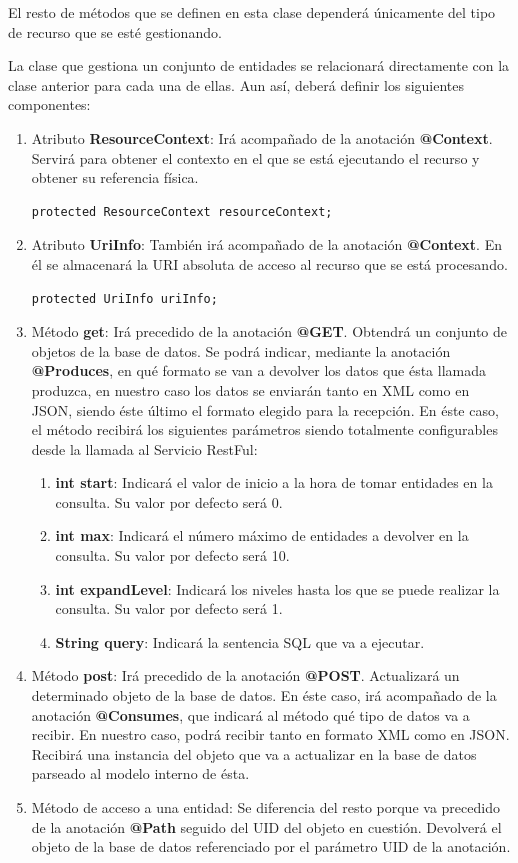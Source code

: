 El resto de métodos que se definen en esta clase dependerá únicamente del tipo de recurso que se esté gestionando.
\bigskip
\par
La clase que gestiona un conjunto de entidades se relacionará directamente con la clase anterior para cada una de ellas. Aun así, deberá definir los siguientes componentes:
\begin{enumerate}
\item Atributo \textbf{ResourceContext}: Irá acompañado de la anotación \textbf{@Context}. Servirá para obtener el contexto en el que se está ejecutando el recurso y obtener su referencia física.\begin{verbatim}protected ResourceContext resourceContext;\end{verbatim} 
\item Atributo \textbf{UriInfo}: También irá acompañado de la anotación \textbf{@Context}. En él se almacenará la URI absoluta de acceso al recurso que se está procesando. \begin{verbatim}protected UriInfo uriInfo;\end{verbatim} 
\item Método \textbf{get}: Irá precedido de la anotación \textbf{@GET}. Obtendrá un conjunto de objetos de la base de datos. Se podrá indicar, mediante la anotación \textbf{@Produces}, en qué formato se van a devolver los datos que ésta llamada produzca, en nuestro caso los datos se enviarán tanto en XML como en JSON, siendo éste último el formato elegido para la recepción. En éste caso, el método recibirá los siguientes parámetros siendo totalmente configurables desde la llamada al Servicio RestFul:
\begin{enumerate}
\item \textbf{int start}: Indicará el valor de inicio a la hora de tomar entidades en la consulta. Su valor por defecto será 0.
\item \textbf{int max}: Indicará el número máximo de entidades a devolver en la consulta. Su valor por defecto será 10.
\item \textbf{int expandLevel}: Indicará los niveles hasta los que se puede realizar la consulta. Su valor por defecto será 1.
\item \textbf{String query}: Indicará la sentencia SQL que va a ejecutar.
\end{enumerate}
\item Método \textbf{post}: Irá precedido de la anotación \textbf{@POST}. Actualizará un determinado objeto de la base de datos. En éste caso, irá acompañado de la anotación \textbf{@Consumes}, que indicará al método qué tipo de datos va a recibir. En nuestro caso, podrá recibir tanto en formato XML como en JSON. Recibirá una instancia del objeto que va a actualizar en la base de datos parseado al modelo interno de ésta.
\item Método de acceso a una entidad: Se diferencia del resto porque va precedido de la anotación \textbf{@Path} seguido del UID del objeto en cuestión. Devolverá el objeto de la base de datos referenciado por el parámetro UID de la anotación. 
\end{enumerate}

